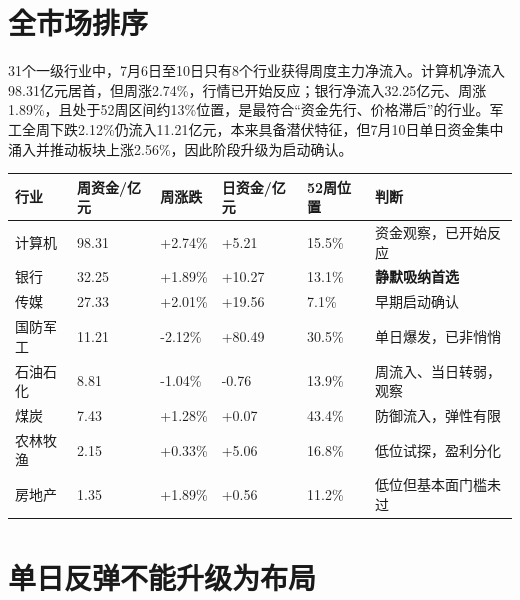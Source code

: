 \section{全市场排序}

31个一级行业中，7月6日至10日只有8个行业获得周度主力净流入。计算机净流入98.31亿元居首，但周涨2.74\%，行情已开始反应；银行净流入32.25亿元、周涨1.89\%，且处于52周区间约13\%位置，是最符合“资金先行、价格滞后”的行业。军工全周下跌2.12\%仍流入11.21亿元，本来具备潜伏特征，但7月10日单日资金集中涌入并推动板块上涨2.56\%，因此阶段升级为启动确认。

\begin{exhibitbox}
\begin{tabularx}{\textwidth}{L{2.5cm}R{2.2cm}R{2.0cm}R{2.0cm}R{2.0cm}X}
\toprule
\textbf{行业} & \textbf{周资金/亿元} & \textbf{周涨跌} & \textbf{日资金/亿元} & \textbf{52周位置} & \textbf{判断} \\
\midrule
计算机 & 98.31 & +2.74\% & +5.21 & 15.5\% & 资金观察，已开始反应 \\
银行 & 32.25 & +1.89\% & +10.27 & 13.1\% & \textbf{静默吸纳首选} \\
传媒 & 27.33 & +2.01\% & +19.56 & 7.1\% & 早期启动确认 \\
国防军工 & 11.21 & -2.12\% & +80.49 & 30.5\% & 单日爆发，已非悄悄 \\
石油石化 & 8.81 & -1.04\% & -0.76 & 13.9\% & 周流入、当日转弱，观察 \\
煤炭 & 7.43 & +1.28\% & +0.07 & 43.4\% & 防御流入，弹性有限 \\
农林牧渔 & 2.15 & +0.33\% & +5.06 & 16.8\% & 低位试探，盈利分化 \\
房地产 & 1.35 & +1.89\% & +0.56 & 11.2\% & 低位但基本面门槛未过 \\
\bottomrule
\end{tabularx}
\end{exhibitbox}

\section{单日反弹不能升级为布局}

